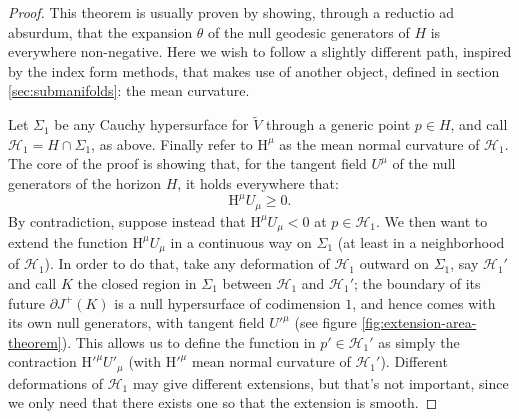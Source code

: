 \begin{proof}
	This theorem is usually proven by showing, through a reductio ad absurdum, that the expansion \(\theta\) of the null geodesic generators of \(H\) is everywhere non-negative. Here we wish to follow a slightly different path, inspired by the index form methods, that makes use of another object, defined in section \ref{sec:submanifolds}: the mean curvature.
	
	Let \(\Sigma_1\) be any Cauchy hypersurface for \(\tilde{V}\) through a generic point \(p\in H\), and call \(\mathscr{H}_1 = H \cap \Sigma_1\), as above. Finally refer to \(\mathrm{H}^{\mu}\) as the mean normal curvature of \(\mathscr{H}_1\).
	The core of the proof is showing that, for the tangent field \(U^{\mu}\) of the null generators of the horizon \(H\), it holds everywhere that:
	\begin{equation}
	\label{eq:exp-null-generators}
		\mathrm{H}^{\mu}U_{\mu} \ge 0.
	\end{equation}
	By contradiction, suppose instead that \(\mathrm{H}^{\mu}U_{\mu} < 0\) at \(p\in \mathscr{H}_1\). We then want to extend the function \(\mathrm{H}^{\mu}U_{\mu}\) in a continuous way on \(\Sigma_1\) (at least in a neighborhood of \(\mathscr{H}_1\)). 
	\noindent
	In order to do that, take any deformation of \(\mathscr{H}_1\) outward on \(\Sigma_1\), say \(\mathscr{H}_1'\) and call \(K\) the closed region in \(\Sigma_1\) between \(\mathscr{H}_1\) and \(\mathscr{H}_1'\); the boundary of its future \(\partial J^+(K)\) is a null hypersurface of codimension \(1\), and hence comes with its own null generators, with tangent field \(U'^{\mu}\) (see figure \ref{fig:extension-area-theorem}). This allows us to define the function in \(p' \in\mathscr{H}_1'\) as simply the contraction 
	\(\mathrm{H}'^{\mu}U'_{\mu}\) (with \(\mathrm{H}'^{\mu}\) mean normal curvature of \(\mathscr{H}_1'\)). Different deformations of \(\mathscr{H}_1\) may give different extensions, but that's not important, since we only need that there exists one so that the extension is smooth.
	

\end{proof}
